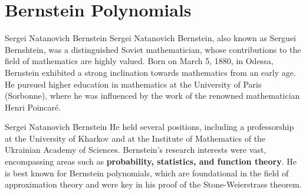 \documentclass{beamer}
\begin{document}
\section{Bernstein Polynomials}
\begin{frame}{Sergei Natanovich Bernstein}
\cite{bernstein2023encyclopedia}Sergei Natanovich Bernstein, also known as Serguei Bernshtein, was a distinguished Soviet mathematician, whose contributions to the field of mathematics are highly valued. Born on March 5, 1880, in Odessa, Bernstein exhibited a strong inclination towards mathematics from an early age. He pursued higher education in mathematics at the University of Paris (Sorbonne), where he was influenced by the work of the renowned mathematician Henri Poincaré.
\end{frame}
\begin{frame}{Sergei Natanovich Bernstein}
    He held several positions, including a professorship at the University of Kharkov and at the Institute of Mathematics of the Ukrainian Academy of Sciences. Bernstein's research interests were vast, encompassing areas such as \textbf{probability, statistics, and function theory}. He is best known for Bernstein polynomials, which are foundational in the field of approximation theory and were key in his proof of the Stone-Weierstrass theorem.
\end{frame}
\end{document}
